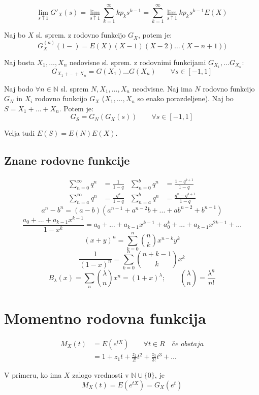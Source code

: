 \begin{multicols}{5}
\[ \lim_{s \uparrow 1} G'_X(s) = \lim_{s \uparrow 1} \sum_{k=1}^\infty k p_k s^{k-1} =  \sum_{k=1}^\infty  \lim_{s \uparrow 1} k p_k s^{k-1}  E(X)\]

Naj bo $X$ sl. sprem. z rodovno funkcijo $G_X$, potem je:
\[ G_X^{(n)}(1-) = E(X)(X-1)(X-2)\dots (X-n+1))\]

Naj bosta $X_1, \dots , X_n$ nedovisne sl. sprem. z rodovnimi funkcijami $G_{X_1}, \dots G_{X_n}$:
\[ G_{X_1+\dots + X_n} = G(X_1) \dots G(X_n) \qquad \forall s \in [-1, 1]\]


Naj bodo $\forall n \in \mathbb{N}$ sl. sprem $N, X_1, \dots, X_n$ neodvisne. Naj ima $N$ rodovno funkcijo $G_N$ in $X_i$ rodovno funkcijo $G_X$ ($X_1, \dots, X_n$ so enako porazdeljene).
Naj bo $S = X_1 +  \dots + X_n$. Potem je:
\[ G_S = G_N(G_X(s)) \qquad \forall s \in [-1, 1]\]

Velja tudi $E(S) = E(N)E(X)$.

\subsection{Znane rodovne funkcije}
\[
    \begin{aligned}
        \sum_{n=0}^{\infty} q^n &= \frac{1}{1-q} &
        \sum_{n=0}^{b} q^n &= \frac{1-q^{b+1}}{1-q}
        \\
        \sum_{n=a}^{\infty} q^n &= \frac{q^{a}}{1-q} &
        \sum_{n=a}^{b} q^n &= \frac{q^a-q^{b+1}}{1-q}
    \end{aligned}
\]
\[
    a^n - b^n = (a-b)(a^{n-1} + a^{n-2}b + ... + ab^{n-2} + b^{n-1})  
\]
\[ \textstyle \frac{a_0 + ... + a_{k-1}x^{k-1}}{1-x^k} = a_0 + ... + a_{k-1}x^{k-1} + a_0^k + ... + a_{k-1}x^{2k-1} + ...\]
\[ (x+y)^n = \sum_{k=0}^{n} \binom{n}{k} x^{n-k}y^{k} \]
\[ \frac{1}{(1-x)^n} = \sum_{k=0}^{n} \binom{n+k-1}{k} x^{k} \]
\[ B_\lambda(x) = \sum_{n} \binom{\lambda}{n} x^{n} = (1+x)^\lambda; \qquad \binom{\lambda}{n} = \frac{\lambda^{\underline{n}}}{n!}\]


\section{Momentno rodovna funkcija}
\begin{align*}
	M_X(t) &= E(e^{tX}) \qquad \forall t \in R \quad \textit{če obstaja} \\
	&= 1 + z_1t + \frac{z_2}{2!} t^2 + \frac{z_3}{3!} t^3 + \dots 
\end{align*} 

V primeru, ko ima $X$ zalogo vrednosti v $\mathbb{N} \cup \{0\}$, je 
\[M_X(t) = E(e^{tX}) = G_X(e^t) \]


\end{multicols}
